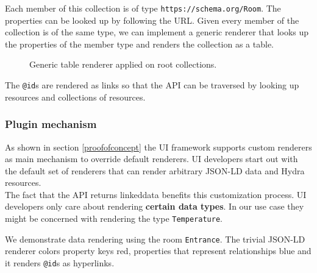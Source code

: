Each member of this collection is of type \lstinline{https://schema.org/Room}. The properties can be looked up by following the URL. Given every member of the collection is of the same type, we can implement a generic renderer that looks up the properties of the member type and renders the collection as a table.

\begin{figure}[!htb]
  \caption{Generic table renderer applied on root collections.}
\end{figure}

The \lstinline{@id}s are rendered as links so that the API can be traversed by looking up resources and collections of resources.

\subsubsection{Plugin mechanism}\label{pluginmechanism}
As shown in section \ref{proofofconcept} the UI framework supports custom renderers as main mechanism to override default renderers. UI developers start out with the default set of renderers that can render arbitrary JSON-LD data and Hydra resources. \\
The fact that the API returns \gls{linkeddata} benefits this customization process. UI developers only care about rendering \textbf{certain data types}. In our use case they might be concerned with rendering the type \lstinline{Temperature}.

We demonstrate data rendering using the room \lstinline{Entrance}. The trivial JSON-LD renderer colors property keys red, properties that represent relationships blue and it renders \lstinline{@id}s as hyperlinks.

